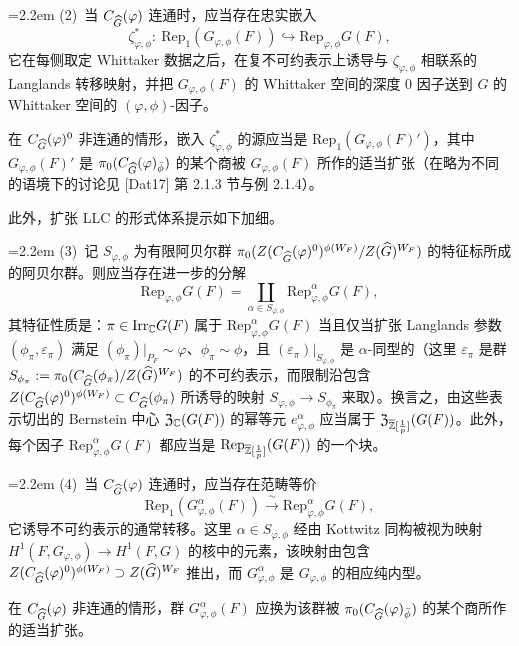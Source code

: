 \smallskip
\noindent\hangindent=2.2em
(2)\ 当 $C_{\widehat{G}}(\varphi)$ 连通时，应当存在忠实嵌入
\[
\zeta^*_{\varphi,\phi}:\ \mathrm{Rep}_1(G_{\varphi,\phi}(F))
\hookrightarrow \mathrm{Rep}_{\varphi,\phi}G(F),
\]
它在每侧取定 Whittaker 数据之后，在复不可约表示上诱导与 $\zeta_{\varphi,\phi}$ 相联系的 Langlands 转移映射，并把 $G_{\varphi,\phi}(F)$ 的 Whittaker 空间的深度 $0$ 因子送到 $G$ 的 Whittaker 空间的 $(\varphi,\phi)$-因子。

在 $C_{\widehat{G}}(\varphi)^0$ 非连通的情形，嵌入 $\zeta^*_{\varphi,\phi}$ 的源应当是 $\mathrm{Rep}_1(G_{\varphi,\phi}(F)')$，其中 $G_{\varphi,\phi}(F)'$ 是 $\pi_0(C_{\widehat{G}}(\varphi)_{\bar\phi})$ 的某个商被 $G_{\varphi,\phi}(F)$ 所作的适当扩张（在略为不同的语境下的讨论见 [Dat17] 第 2.1.3 节与例 2.1.4）。

此外，扩张 LLC 的形式体系提示如下加细。

\smallskip
\noindent\hangindent=2.2em
(3)\ 记 $S_{\varphi,\phi}$ 为有限阿贝尔群 $\pi_0(Z(C_{\widehat{G}}(\varphi)^0)^{\phi(W_F)}/Z(\widehat{G})^{W_F})$ 的特征标所成的阿贝尔群。则应当存在进一步的分解
\[
\mathrm{Rep}_{\varphi,\phi}G(F)=\coprod_{\alpha\in S_{\varphi,\phi}}\mathrm{Rep}^\alpha_{\varphi,\phi}G(F),
\]
其特征性质是：$\pi\in\mathrm{Irr}_{\mathbb{C}}G(F)$ 属于 $\mathrm{Rep}^\alpha_{\varphi,\phi}G(F)$ 当且仅当扩张 Langlands 参数 $(\phi_\pi,\varepsilon_\pi)$ 满足 $(\phi_\pi)|_{P_F}\sim\varphi$、$\phi_\pi\sim\phi$，且 $(\varepsilon_\pi)|_{S_{\varphi,\phi}}$ 是 $\alpha$-同型的（这里 $\varepsilon_\pi$ 是群 $S_{\phi_\pi}:=\pi_0(C_{\widehat{G}}(\phi_\pi)/Z(\widehat{G})^{W_F})$ 的不可约表示，而限制沿包含 $Z(C_{\widehat{G}}(\varphi)^0)^{\phi(W_F)}\subset C_{\widehat{G}}(\phi_\pi)$ 所诱导的映射 $S_{\varphi,\phi}\to S_{\phi_\pi}$ 来取）。换言之，由这些表示切出的 Bernstein 中心 $\mathfrak Z_{\mathbb{C}}(G(F))$ 的幂等元 $e^\alpha_{\varphi,\phi}$ 应当属于 $\mathfrak Z_{\overline{\mathbb{Z}}[\frac1p]}(G(F))$。此外，每个因子 $\mathrm{Rep}^\alpha_{\varphi,\phi}G(F)$ 都应当是 $\mathrm{Rep}_{\overline{\mathbb{Z}}[\frac1p]}(G(F))$ 的一个块。

\smallskip
\noindent\hangindent=2.2em
(4)\ 当 $C_{\widehat{G}}(\varphi)$ 连通时，应当存在范畴等价
\[
\mathrm{Rep}_1(G^\alpha_{\varphi,\phi}(F))\xrightarrow{\ \sim\ }\mathrm{Rep}^\alpha_{\varphi,\phi}G(F),
\]
它诱导不可约表示的通常转移。这里 $\alpha\in S_{\varphi,\phi}$ 经由 Kottwitz 同构被视为映射 $H^1(F,G_{\varphi,\phi})\to H^1(F,G)$ 的核中的元素，该映射由包含 $Z(C_{\widehat{G}}(\varphi)^0)^{\phi(W_F)}\supset Z(\widehat{G})^{W_F}$ 推出，而 $G^\alpha_{\varphi,\phi}$ 是 $G_{\varphi,\phi}$ 的相应纯内型。

在 $C_{\widehat{G}}(\varphi)$ 非连通的情形，群 $G^\alpha_{\varphi,\phi}(F)$ 应换为该群被 $\pi_0(C_{\widehat{G}}(\varphi)_{\bar\phi})$ 的某个商所作的适当扩张。

